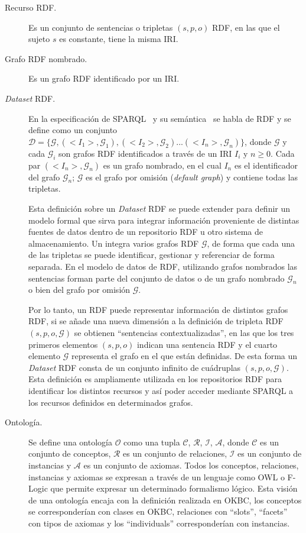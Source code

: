 \begin{description}
\item [Recurso RDF.] Es un conjunto de sentencias o tripletas $(s,p,o)$ RDF, en las que el sujeto $s$ 
es constante, tiene la misma IRI.

\item [Grafo RDF nombrado.] Es un grafo RDF identificado por un IRI. 

\item [\textit{Dataset} RDF.] En la especificación de SPARQL~\cite{Sparql} y su semántica~\cite{SparqlSemantics} se habla
de \dataset RDF y se define como un conjunto $\mathcal{D} = \{\mathcal{G}, (<I_1>, \mathcal{G}_1), (<I_2>, \mathcal{G}_2)...(<I_n>,\mathcal{G}_n)\}$,
donde $\mathcal{G}$ y cada $\mathcal{G}_i$ son grafos RDF identificados a través de un IRI $I_i$ y $n\geq0$.
 Cada par $(<I_n>, \mathcal{G}_n)$ es un grafo nombrado, en el cual $I_n$ es el identificador del grafo
$\mathcal{G}_n$; $\mathcal{G}$ es el grafo por omisión (\textit{default graph}) y contiene
todas las tripletas. 

Esta definición sobre un \textit{Dataset} RDF se puede extender para definir un modelo formal que sirva
para integrar información proveniente de distintas fuentes de datos dentro de un
repositorio RDF u otro sistema de almacenamiento. Un \dataset integra varios grafos RDF
$\mathcal{G}$, de forma que cada una de las tripletas se puede identificar, gestionar y referenciar
de forma separada. En el modelo de datos de RDF, utilizando grafos nombrados las sentencias forman parte del conjunto de datos o de un 
grafo nombrado $\mathcal{G}_n$ o bien del grafo por omisión $\mathcal{G}$.

Por lo tanto, un \dataset RDF puede representar información de distintos grafos RDF, si se añade
una nueva dimensión a la definición de tripleta RDF $(s,p,o,\mathcal{G})$ se obtienen 
``sentencias contextualizadas'', en las que los tres primeros elementos $(s,p,o)$ indican
una sentencia RDF y el cuarto elemento $\mathcal{G}$ representa el grafo en el que están
definidas. De esta forma un \textit{Dataset} RDF consta de un conjunto infinito de cuádruplas $(s,p,o,\mathcal{G})$. 
Esta definición es ampliamente utilizada en los repositorios RDF para identificar los distintos recursos y así
poder acceder mediante SPARQL a los recursos definidos en determinados grafos.


\item [Ontología.] Se define una ontología $\mathcal{O}$ como una tupla $\mathcal{C}$, $\mathcal{R}$, $\mathcal{I}$, $\mathcal{A}$, donde $\mathcal{C}$ es un conjunto de conceptos,  $\mathcal{R}$ es un conjunto de relaciones, $\mathcal{I}$ es un 
conjunto de instancias y  $\mathcal{A}$ es un conjunto de axiomas. Todos los conceptos, relaciones, instancias
y axiomas se expresan a través de un lenguaje como OWL o F-Logic que permite expresar un determinado formalismo lógico. 
Esta visión de una ontología encaja con la definición realizada en OKBC, los conceptos se corresponderían con clases en OKBC, relaciones con ``slots'', ``facets'' con tipos de axiomas y los ``individuals'' 
corresponderían con instancias.


\end{description}
